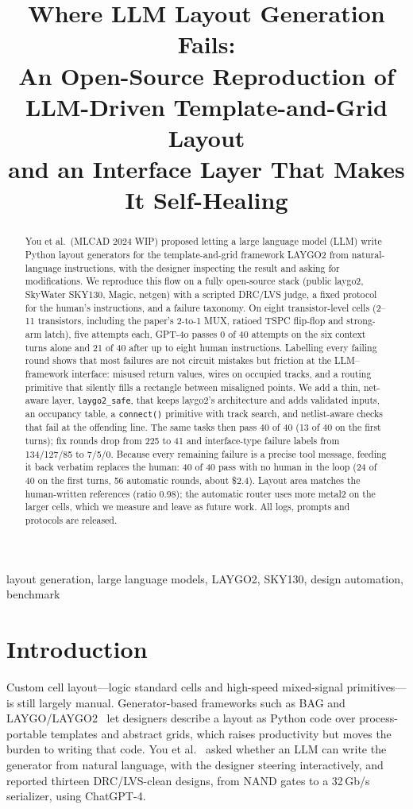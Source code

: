 \documentclass[conference]{IEEEtran}
\title{Where LLM Layout Generation Fails:\\An Open-Source Reproduction of LLM-Driven Template-and-Grid Layout\\and an Interface Layer That Makes It Self-Healing}
\author{\IEEEauthorblockN{Jongkyoung, Han}%
\IEEEauthorblockA{Independent researcher\\ \url{https://github.com/Toragonite/laygo2-llm-agent}}}
\newcommand{\code}[1]{\texttt{#1}}
\begin{document}
\maketitle

\begin{abstract}
You et al.\ (MLCAD 2024 WIP) proposed letting a large language model (LLM) write Python layout generators for the template-and-grid framework LAYGO2 from natural-language instructions, with the designer inspecting the result and asking for modifications. We reproduce this flow on a fully open-source stack (public laygo2, SkyWater SKY130, Magic, netgen) with a scripted DRC/LVS judge, a fixed protocol for the human's instructions, and a failure taxonomy. On eight transistor-level cells (2--11 transistors, including the paper's 2-to-1 MUX, ratioed TSPC flip-flop and strong-arm latch), five attempts each, GPT-4o passes 0 of 40 attempts on the six context turns alone and 21 of 40 after up to eight human instructions. Labelling every failing round shows that most failures are not circuit mistakes but friction at the LLM--framework interface: misused return values, wires on occupied tracks, and a routing primitive that silently fills a rectangle between misaligned points. We add a thin, net-aware layer, \code{laygo2\_safe}, that keeps laygo2's architecture and adds validated inputs, an occupancy table, a \code{connect()} primitive with track search, and netlist-aware checks that fail at the offending line. The same tasks then pass 40 of 40 (13 of 40 on the first turns); fix rounds drop from 225 to 41 and interface-type failure labels from 134/127/85 to 7/5/0. Because every remaining failure is a precise tool message, feeding it back verbatim replaces the human: 40 of 40 pass with no human in the loop (24 of 40 on the first turns, 56 automatic rounds, about \$2.4). Layout area matches the human-written references (ratio 0.98); the automatic router uses more metal2 on the larger cells, which we measure and leave as future work. All logs, prompts and protocols are released.
\end{abstract}

\begin{IEEEkeywords}
layout generation, large language models, LAYGO2, SKY130, design automation, benchmark
\end{IEEEkeywords}

\section{Introduction}
Custom cell layout---logic standard cells and high-speed mixed-signal primitives---is still largely manual. Generator-based frameworks such as BAG and LAYGO/LAYGO2~\cite{bag2,laygo,laygo2} let designers describe a layout as Python code over process-portable templates and abstract grids, which raises productivity but moves the burden to writing that code. You et al.~\cite{you2024} asked whether an LLM can write the generator from natural language, with the designer steering interactively, and reported thirteen DRC/LVS-clean designs, from NAND gates to a 32\,Gb/s serializer, using ChatGPT-4.
\end{document}
